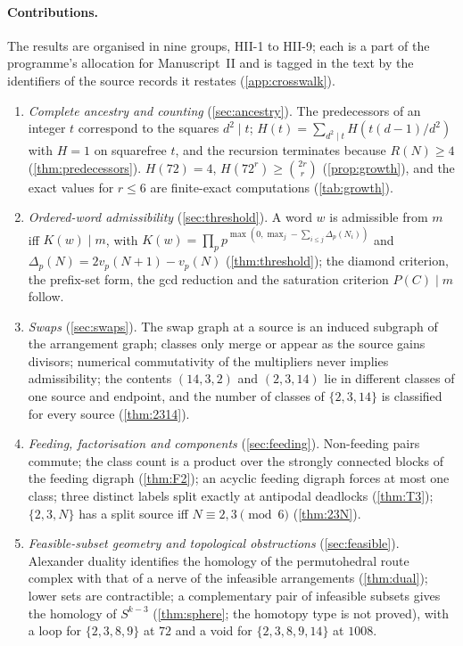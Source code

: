 \paragraph{Contributions.}
The results are organised in nine groups, HII-1 to HII-9; each is a part of the programme's allocation for Manuscript~II and is tagged in the text by the identifiers of the source records it restates (\cref{app:crosswalk}).
\begin{enumerate}[leftmargin=2.2em,itemsep=2pt]
\item[\textbf{HII-1}] \emph{Complete ancestry and counting} (\cref{sec:ancestry}). The predecessors of an integer $t$ correspond to the squares $d^2\mid t$; $H(t)=\sum_{d^2\mid t}H(t(d-1)/d^2)$ with $H=1$ on squarefree $t$, and the recursion terminates because $R(N)\ge4$ (\cref{thm:predecessors}). $H(72)=4$, $H(72^r)\ge\binom{2r}{r}$ (\cref{prop:growth}), and the exact values for $r\le 6$ are finite-exact computations (\cref{tab:growth}).
\item[\textbf{HII-2}] \emph{Ordered-word admissibility} (\cref{sec:threshold}). A word $w$ is admissible from $m$ iff $K(w)\mid m$, with $K(w)=\prod_p p^{\max(0,\max_j -\sum_{i\le j}\Delta_p(N_i))}$ and $\Delta_p(N)=2v_p(N+1)-v_p(N)$ (\cref{thm:threshold}); the diamond criterion, the prefix-set form, the gcd reduction and the saturation criterion $P(C)\mid m$ follow.
\item[\textbf{HII-3}] \emph{Swaps} (\cref{sec:swaps}). The swap graph at a source is an induced subgraph of the arrangement graph; classes only merge or appear as the source gains divisors; numerical commutativity of the multipliers never implies admissibility; the contents $(14,3,2)$ and $(2,3,14)$ lie in different classes of one source and endpoint, and the number of classes of $\{2,3,14\}$ is classified for every source (\cref{thm:2314}).
\item[\textbf{HII-4}] \emph{Feeding, factorisation and components} (\cref{sec:feeding}). Non-feeding pairs commute; the class count is a product over the strongly connected blocks of the feeding digraph (\cref{thm:F2}); an acyclic feeding digraph forces at most one class; three distinct labels split exactly at antipodal deadlocks (\cref{thm:T3}); $\{2,3,N\}$ has a split source iff $N\equiv2,3\pmod 6$ (\cref{thm:23N}).
\item[\textbf{HII-5}] \emph{Feasible-subset geometry and topological obstructions} (\cref{sec:feasible}). Alexander duality identifies the homology of the permutohedral route complex with that of a nerve of the infeasible arrangements (\cref{thm:dual}); lower sets are contractible; a complementary pair of infeasible subsets gives the homology of $S^{k-3}$ (\cref{thm:sphere}; the homotopy type is not proved), with a loop for $\{2,3,8,9\}$ at $72$ and a void for $\{2,3,8,9,14\}$ at $1008$.

\end{enumerate}
